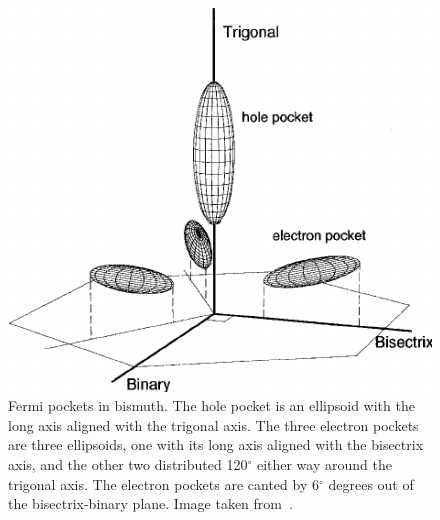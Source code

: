 \documentclass{thesis-umich}
\begin{document}
\begin{figure}
	\centering
	\caption[Fermi Pockets in Bismuth]{Fermi pockets in bismuth. The hole pocket is an ellipsoid with the long axis aligned with the trigonal axis. The three electron pockets are three ellipsoids, one with its long axis aligned with the bisectrix axis, and the other two distributed 120$^\circ$ either way around the trigonal axis. The electron pockets are canted by 6$^\circ$ degrees out of the bisectrix-binary plane. Image taken from~\cite{Yang2001}.}
	\label{fig:bismuth_pockets}
	\includegraphics[width=0.5\columnwidth]{figures/bismuth_pockets.png}
\end{figure}
\end{document}
